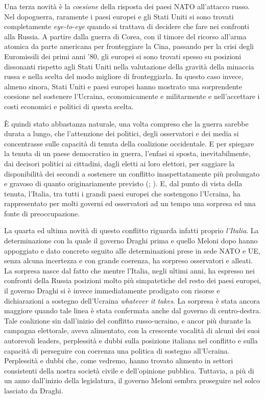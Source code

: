 \documentclass[
  openany]{book}
\begin{document}
Una terza novità è la \emph{coesione} della risposta dei paesi NATO all'attacco russo. Nel dopoguerra, raramente i paesi europei e gli Stati Uniti si sono trovati completamente \emph{eye-to-eye} quando si trattava di decidere che fare nei confronti alla Russia. A partire dalla guerra di Corea, con il timore del ricorso all'arma atomica da parte americana per fronteggiare la Cina, passando per la crisi degli Euromissili dei primi anni '80, gli europei si sono trovati spesso su posizioni dissonanti rispetto agli Stati Uniti nella valutazione della gravità della minaccia russa e nella scelta del modo migliore di fronteggiarla. In questo caso invece, almeno sinora, Stati Uniti e paesi europei hanno mostrato una sorprendente coesione nel sostenere l'Ucraina, economicamente e militarmente e nell'accettare i costi economici e politici di questa scelta.

È quindi stato abbastanza naturale, una volta compreso che la guerra sarebbe durata a lungo, che l'attenzione dei politici, degli osservatori e dei media si concentrasse sulle capacità di tenuta della coalizione occidentale. E per spiegare la tenuta di un paese democratico in guerra, l'enfasi si sposta, inevitabilmente, dai decisori politici ai cittadini, dagli eletti ai loro elettori, per saggiare la disponibilità dei secondi a sostenere un conflitto inaspettatamente più prolungato e gravoso di quanto originariamente previsto (\citet{Mueller1971}; \citet{Aldrich-et-al2006}). E, dal punto di vista della tenuta, l'Italia, tra tutti i grandi paesi europei che sostengono l'Ucraina, ha rappresentato per molti governi ed osservatori ad un tempo una sorpresa ed una fonte di preoccupazione.

La quarta ed ultima novità di questo conflitto riguarda infatti proprio \emph{l'Italia}. La determinazione con la quale il governo Draghi prima e quello Meloni dopo hanno appoggiato e dato concreto seguito alle determinazioni prese in sede NATO e UE, senza alcuna incertezza e con grande coerenza, ha sorpreso osservatori e alleati. La sorpresa nasce dal fatto che mentre l'Italia, negli ultimi anni, ha espresso nei confronti della Russia posizioni molto più simpatetiche del resto dei paesi europei, il governo Draghi si è invece immediatamente prodigato con risorse e dichiarazioni a sostegno dell'Ucraina \emph{whatever it takes}. La sorpresa è stata ancora maggiore quando tale linea è stata confermata anche dal governo di centro-destra. Tale coalizione sin dall'inizio del conflitto russo-ucraino, e ancor più durante la campagna elettorale, aveva alimentato, con la crescente vocalità di alcuni dei suoi autorevoli leaders, perplessità e dubbi sulla posizione italiana nel conflitto e sulla capacità di perseguire con coerenza una politica di sostegno all'Ucraina. Perplessità e dubbi che, come vedremo, hanno trovato alimento in settori consistenti della nostra società civile e dell'opinione pubblica. Tuttavia, a più di un anno dall'inizio della legislatura, il governo Meloni sembra proseguire nel solco lasciato da Draghi.
\end{document}
